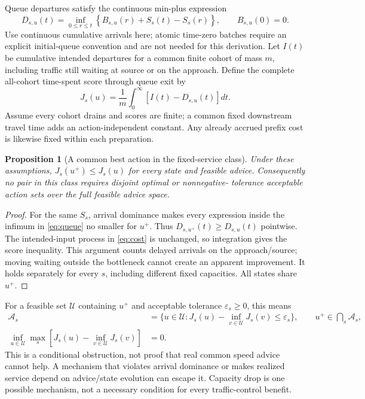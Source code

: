 \documentclass[11pt]{article}
\newtheorem{proposition}{Proposition}
\begin{document}
Queue departures satisfy the continuous min-plus expression
\begin{equation}
D_{s,u}(t)=\inf_{0\leq r\leq t}
\left\{B_{s,u}(r)+S_s(t)-S_s(r)\right\},\qquad B_{s,u}(0)=0.
\label{eq:queue}
\end{equation}
Use continuous cumulative arrivals here; atomic time-zero batches require an
explicit initial-queue convention and are not needed for this derivation.
Let $I(t)$ be cumulative intended departures for a common finite cohort of mass
$m$, including traffic still waiting at source or on the approach. Define the
complete all-cohort time-spent score through queue exit by
\begin{equation}
J_s(u)=\frac{1}{m}\int_0^\infty\left[I(t)-D_{s,u}(t)\right]dt.
\label{eq:cost}
\end{equation}
Assume every cohort drains and scores are finite; a common fixed downstream
travel time adds an action-independent constant. Any already accrued prefix
cost is likewise fixed within each preparation.

\begin{proposition}[A common best action in the fixed-service class]
Under these assumptions, $J_s(u^+)\leq J_s(u)$ for every state and feasible advice.
Consequently no pair in this class requires disjoint optimal or nonnegative-
tolerance acceptable action sets over the full feasible advice space.
\end{proposition}
\begin{proof}
For the same $S_s$, arrival dominance makes every expression inside the infimum
in \eqref{eq:queue} no smaller for $u^+$. Thus
$D_{s,u^+}(t)\geq D_{s,u}(t)$ pointwise. The intended-input process in
\eqref{eq:cost} is unchanged, so integration gives the score inequality. This
argument counts delayed arrivals on the approach/source; moving waiting outside
the bottleneck cannot create an apparent improvement. It holds separately for
every $s$, including different fixed capacities. All states share $u^+$.
\end{proof}

For a feasible set $\mathcal U$ containing $u^+$ and acceptable tolerance
$\varepsilon_s\geq0$, this means
\begin{align}
\mathcal A_s&=\{u\in\mathcal U:J_s(u)-\inf_{v\in\mathcal U}J_s(v)
\leq\varepsilon_s\},\qquad u^+\in\bigcap_s\mathcal A_s,\\
\inf_{u\in\mathcal U}\max_s
\left[J_s(u)-\inf_{v\in\mathcal U}J_s(v)\right]&=0.
\end{align}
This is a conditional obstruction, not proof that real common speed advice
cannot help. A mechanism that violates arrival dominance or makes realized
service depend on advice/state evolution can escape it. Capacity drop is one
possible mechanism, not a necessary condition for every traffic-control benefit.
\end{document}

